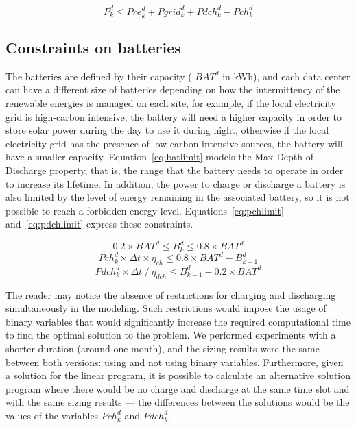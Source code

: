 \begin{equation} \label{eq:pkdconstraint}
    P^d_k \leq Pre^d_k + Pgrid^d_k + Pdch_k^d - Pch_k^d
\end{equation}

\subsection{Constraints on batteries}

The batteries are defined by their capacity ( $BAT^d$ in kWh), and each data center can have a different size of batteries depending on how the intermittency of the renewable energies is managed on each site, for example, if the local electricity grid is high-carbon intensive, the battery will need a higher capacity in order to store solar power during the day to use it during night, otherwise if the local electricity grid has the presence of low-carbon intensive sources, the battery will have a smaller capacity. Equation~\eqref{eq:batlimit} models the Max Depth of Discharge property, that is, the range that the battery needs to operate in order to increase its lifetime. In addition, the power to charge or discharge a battery is also limited by the level of energy remaining in the associated battery, so it is not possible to reach a forbidden energy level. Equations~\eqref{eq:pchlimit} and~\eqref{eq:pdchlimit} express these constraints.

\begin{equation} \label{eq:batlimit}
0.2\times BAT^d\leq B_k^d\leq 0.8\times BAT^d
\end{equation}
\begin{equation} \label{eq:pchlimit}
Pch^d_k \times \Delta t \times \eta_{ch} \leq 0.8\times BAT^d - B^d_{k-1}
\end{equation}
\begin{equation} \label{eq:pdchlimit}
Pdch^d_k \times \Delta t\ / \ \eta_{dch} \leq B^d_{k-1} - 0.2\times BAT^d
\end{equation}


The reader may notice the absence of restrictions for charging and discharging simultaneously in the modeling. Such restrictions would impose the usage of binary variables that would significantly increase the required computational time to find the optimal solution to the problem. We performed experiments with a shorter duration (around one month), and the sizing results were the same between both versions: using and not using binary variables. Furthermore, given a solution for the linear program, it is possible to calculate an alternative solution program where there would be no charge and discharge at the same time slot and with the same sizing results --- the differences between the solutions would be the values of the variables $Pch_k^d$ and $Pdch_k^d$.


